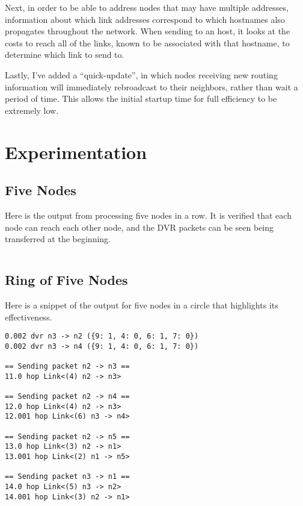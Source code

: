 \documentclass[fleqn,11pt]{article}
\begin{document}
Next, in order to be able to address nodes that may have multiple addresses, information about which link addresses correspond to which hostnames also propagates throughout the network.
When sending to an host, it looks at the costs to reach all of the links, known to be associated with that hostname, to determine which link to send to.

Lastly, I've added a ``quick-update'', in which nodes receiving new routing information will immediately rebroadcast to their neighbors, rather than wait a period of time.
This allows the initial startup time for full efficiency to be extremely low.

\section{Experimentation}

\subsection{Five Nodes}
Here is the output from processing five nodes in a row.
It is verified that each node can reach each other node, and the DVR packets can be seen being transferred at the beginning.
\inputminted[]{text}{data/fivenodes.txt}

\subsection{Ring of Five Nodes}

Here is a snippet of the output for five nodes in a circle that highlights its effectiveness.
\begin{verbatim}
0.002 dvr n3 -> n2 ({9: 1, 4: 0, 6: 1, 7: 0})
0.002 dvr n3 -> n4 ({9: 1, 4: 0, 6: 1, 7: 0})
                                     
== Sending packet n2 -> n3 ==
11.0 hop Link<(4) n2 -> n3>
                                        
== Sending packet n2 -> n4 ==
12.0 hop Link<(4) n2 -> n3>
12.001 hop Link<(6) n3 -> n4>
                                        
== Sending packet n2 -> n5 ==
13.0 hop Link<(3) n2 -> n1>
13.001 hop Link<(2) n1 -> n5>
                                        
== Sending packet n3 -> n1 ==
14.0 hop Link<(5) n3 -> n2>
14.001 hop Link<(3) n2 -> n1>
\end{verbatim}
\end{document}
